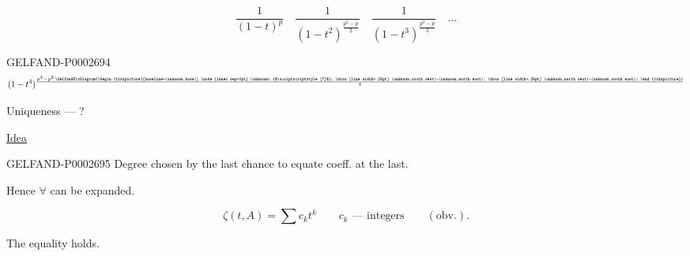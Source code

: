 \begin{equation*}
\frac{1}{(1-t)^p}\quad
\frac{1}{(1-t^2)^{\frac{p^2-p}{2}}}\quad
\frac{1}{(1-t^3)^{\frac{p^3-p}{3}}}\quad\ldots
\end{equation*}

\begin{GelfandAdjacentEvidence}{GELFAND-P000269}{4}
\begin{equation*}
(1-t^4)^{\frac{p^4-p^2\,\GelfandFitDiagram{\begin{tikzpicture}[baseline=(unknown.base)]
\node[inner sep=0pt] (unknown) {$\scriptscriptstyle[?]$};
\draw[line width=.25pt] (unknown.south west)--(unknown.north east);
\draw[line width=.25pt] (unknown.north west)--(unknown.south east);
\end{tikzpicture}}}{4}}
\end{equation*}

\end{GelfandAdjacentEvidence}


Uniqueness --- ?

\underline{Idea}

\begin{GelfandAdjacentEvidence}{GELFAND-P000269}{5}
Degree chosen by the last chance to equate coeff. at the last.

\end{GelfandAdjacentEvidence}


Hence $\forall$ can be expanded.



\hfill{}

\begin{equation*}
\zeta (t, A)=\sum c_kt^k\qquad c_k\text{ --- integers}\qquad (\text{obv.}).
\end{equation*}

The equality holds.

